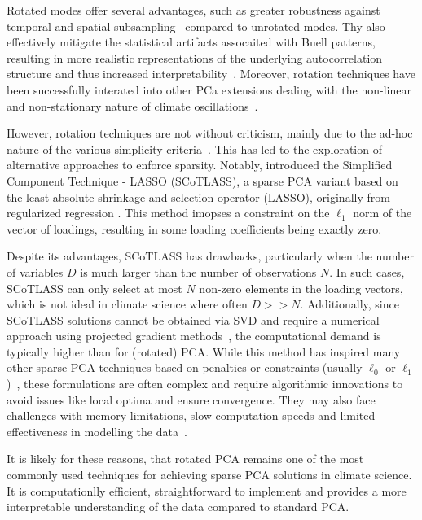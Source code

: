 Rotated modes offer several advantages, such as greater robustness against 
temporal and spatial subsampling~\cite{cheng_robustness_1995} compared to unrotated modes. Thy also effectively mitigate the statistical artifacts assocaited with Buell patterns, resulting in more realistic representations of the underlying autocorrelation structure and thus increased interpretability~\cite{richman_climatic_1985,richman_rotation_1986,lian_evaluation_2012}. Moreover, rotation techniques have been successfully interated into other PCa extensions dealing with the non-linear and non-stationary nature of climate oscillations~\cite{horel_complex_1984,bueso_nonlinear_2020,guilloteau_rotated_2020}.

However, rotation techniques are not without criticism, mainly due to the ad-hoc nature of the various simplicity criteria~\cite[cf.][pp. 270-274]{jolliffe_principal_2002}. This has led to the exploration of alternative approaches to enforce sparsity. Notably, \citet{jolliffe_simplified_2002} introduced the Simplified Component Technique - LASSO (SCoTLASS), a sparse PCA variant based on the least absolute shrinkage and selection operator (LASSO), originally from regularized regression \cite{tibshirani_regression_1996}. This method imopses a constraint on the $\ell_1$ norm of the vector of loadings, resulting in some loading coefficients being exactly zero.

Despite its advantages, SCoTLASS has drawbacks, particularly when the number of variables $D$ is much larger than the number of observations $N$. In such cases, SCoTLASS can only select at most $N$ non-zero elements in the loading vectors, which is not ideal in climate science where often $D>>N$. Additionally, since SCoTLASS solutions cannot be obtained via SVD and require a numerical approach using projected gradient methods~\cite{trendafilov_projected_2006}, the computational demand is typically higher 
than for (rotated) PCA. While this method has inspired many other sparse PCA techniques based on penalties or constraints (usually $\ell_0$ or $\ell_1$)~\cite[see e.g.][]{zou_sparse_2006,zou_selective_2018,erichson_sparse_2020}, these formulations are often complex and require algorithmic innovations to avoid issues like local optima and ensure convergence. They may also face challenges with memory limitations, slow computation speeds and limited effectiveness in modelling the data~\cite{guerra-urzola_guide_2021,camacho_all_2020}.

It is likely for these reasons, that rotated PCA remains one of the most commonly used techniques for achieving sparse PCA solutions in climate science. It is computationlly efficient, straightforward to implement and provides a more interpretable understanding of the data compared to standard PCA.


